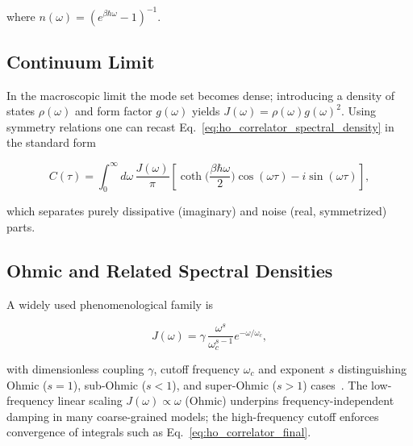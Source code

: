 \noindent
where $n(\omega)= (e^{\beta \hbar \omega}-1)^{-1}$.


\subsection{Continuum Limit}
\label{subsec:continuum_limit}

\noindent
In the macroscopic limit the mode set becomes dense; introducing a density of states $\rho(\omega)$ and form factor $g(\omega)$ yields $J(\omega)=\rho(\omega) g(\omega)^2$. Using symmetry relations one can recast Eq.~\eqref{eq:ho_correlator_spectral_density} in the standard form

\begin{equation} \label{eq:ho_correlator_final}
	C(\tau) = \int_{0}^{\infty} d\omega \, \frac{J(\omega)}{\pi} \left[ \coth\Big(\frac{\beta \hbar \omega}{2}\Big) \cos(\omega \tau) - i \sin(\omega \tau) \right],
\end{equation}

\noindent
which separates purely dissipative (imaginary) and noise (real, symmetrized) parts.


\subsection{Ohmic and Related Spectral Densities}
\label{subsec:ohmic_spectral_density}

\noindent
A widely used phenomenological family is

\begin{equation} \label{eq:ho_ohmic_spectral_density}
	J(\omega) = \gamma \, \frac{\omega^{s}}{\omega_c^{s-1}} e^{-\omega/\omega_c},
\end{equation}

\noindent
with dimensionless coupling $\gamma$, cutoff frequency $\omega_c$ and exponent $s$ distinguishing Ohmic ($s=1$), sub-Ohmic ($s<1$), and super-Ohmic ($s>1$) cases~\cite{weiss2012quantumdissipativesystems, lambertetal2024qutip5quantum}. The low-frequency linear scaling $J(\omega) \propto \omega$ (Ohmic) underpins frequency-independent damping in many coarse-grained models; the high-frequency cutoff enforces convergence of integrals such as Eq.~\eqref{eq:ho_correlator_final}.


